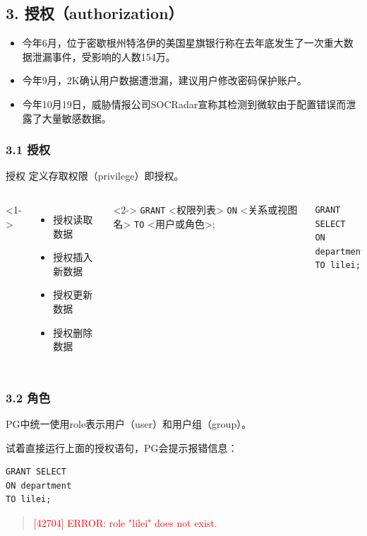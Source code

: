 \documentclass[aspectratio=169, 14pt]{beamer}
\begin{document}
\begin{frame}[fragile]
    \section{\textcolor{darkmidnightblue}{3. 授权（authorization）}}

    \begin{itemize}
        \item 今年6月，位于密歇根州特洛伊的美国星旗银行称在去年底发生了一次重大数据泄漏事件，受影响的人数154万。
        \item 今年9月，2K确认用户数据遭泄漏，建议用户修改密码保护账户。
        \item 今年10月19日，威胁情报公司SOCRadar宣称其检测到微软由于配置错误而泄露了大量敏感数据。
    \end{itemize}
\end{frame}

\begin{frame}[fragile]
    \frametitle{3.1 授权}
\begin{exampleblock}{授权}
定义存取权限（privilege）即授权。    
\end{exampleblock}

\begin{columns}
    <1->
    \begin{itemize}
        \item 授权读取数据
        \item 授权插入新数据
        \item 授权更新数据
        \item 授权删除数据
    \end{itemize}
    <2->
\alert{\texttt{GRANT}} <权限列表>
\alert{\texttt{ON}} <关系或视图名>
\alert{\texttt{TO}} <用户或角色>;

\begin{verbatim}
GRANT SELECT 
ON department 
TO lilei;
\end{verbatim}
\end{columns}

\end{frame}

\begin{frame}[fragile]
    \frametitle{3.2 角色}

PG中统一使用role表示用户（user）和用户组（group）。

试着直接运行上面的授权语句，PG会提示报错信息：

\begin{verbatim}
GRANT SELECT 
ON department 
TO lilei;
\end{verbatim}

\begin{quotation}
    \textcolor{red}{[42704] ERROR: role "lilei" does not exist.}
\end{quotation}

\end{frame}
\end{document}
